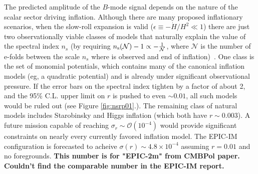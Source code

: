 
The predicted amplitude of the $B$-mode signal depends on the nature of the scalar sector driving inflation. Although there are many proposed inflationary scenarios, when the slow-roll expansion is valid ($\epsilon\equiv-\dot{H}/H^2\ll1$) there are just two observationally viable classes of models that naturally explain the value of the spectral index $n_s$ (by requiring $n_{\rm s}(\mathcal{N})-1\propto-\frac{1}{\mathcal{N}}$, where $\mathcal{N}$ is the number of e-folds between the scale $n_s$ where is observed and end of inflation)~\cite{Mukhanov:2013tua,Roest:2013fha,Creminelli:2014nqa}. One class is the set of monomial potentials, which contains many of the canonical inflation models (eg, a quadratic potential) and is already under significant observational pressure. If the error bars on the spectral index tighten by a factor of about 2, and the 95\% C.L. upper limit on $r$ is pushed to even $\sim0.01$, all such models would be ruled out (see Figure \ref{fig:nsrp01}.). The remaining class of natural models includes Starobinsky and Higgs inflation (which both have $r\sim0.003$). A future mission capable of reaching $\sigma_r\sim\mathcal{O}(10^{-4})$ would provide significant constraints on nearly every currently favored inflation model. The EPIC-IM configuration is forecasted to acheive $\sigma(r)\sim4.8 \times 10^{-4}$ assuming $r=0.01$ and no foregrounds. {\bf This number is for "EPIC-2m" from CMBPol paper. Couldn't find the comparable number in the EPIC-IM report.}
